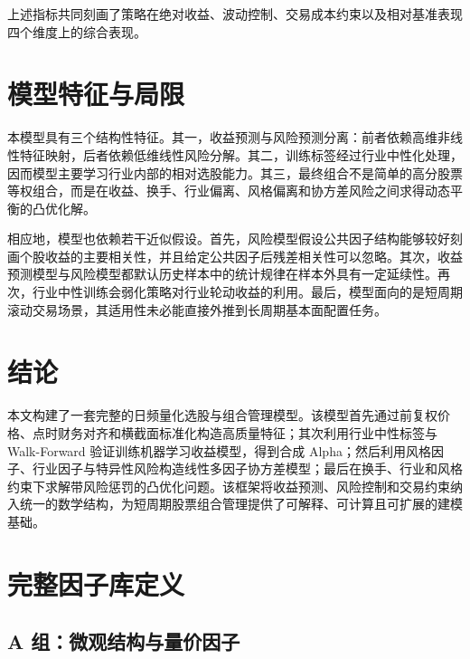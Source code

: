 \documentclass[12pt, a4paper, oneside]{article}
\begin{document}
上述指标共同刻画了策略在绝对收益、波动控制、交易成本约束以及相对基准表现四个维度上的综合表现。

\section{模型特征与局限}

本模型具有三个结构性特征。其一，收益预测与风险预测分离：前者依赖高维非线性特征映射，后者依赖低维线性风险分解。其二，训练标签经过行业中性化处理，因而模型主要学习行业内部的相对选股能力。其三，最终组合不是简单的高分股票等权组合，而是在收益、换手、行业偏离、风格偏离和协方差风险之间求得动态平衡的凸优化解。

相应地，模型也依赖若干近似假设。首先，风险模型假设公共因子结构能够较好刻画个股收益的主要相关性，并且给定公共因子后残差相关性可以忽略。其次，收益预测模型与风险模型都默认历史样本中的统计规律在样本外具有一定延续性。再次，行业中性训练会弱化策略对行业轮动收益的利用。最后，模型面向的是短周期滚动交易场景，其适用性未必能直接外推到长周期基本面配置任务。

\section{结论}

本文构建了一套完整的日频量化选股与组合管理模型。该模型首先通过前复权价格、点时财务对齐和横截面标准化构造高质量特征；其次利用行业中性标签与 Walk-Forward 验证训练机器学习收益模型，得到合成 Alpha；然后利用风格因子、行业因子与特异性风险构造线性多因子协方差模型；最后在换手、行业和风格约束下求解带风险惩罚的凸优化问题。该框架将收益预测、风险控制和交易约束纳入统一的数学结构，为短周期股票组合管理提供了可解释、可计算且可扩展的建模基础。

\appendix

\section{完整因子库定义}

\small
\setlength{\tabcolsep}{3pt}
\setlength{\LTleft}{0pt}
\setlength{\LTright}{0pt}

\subsection{A 组：微观结构与量价因子}
\end{document}
